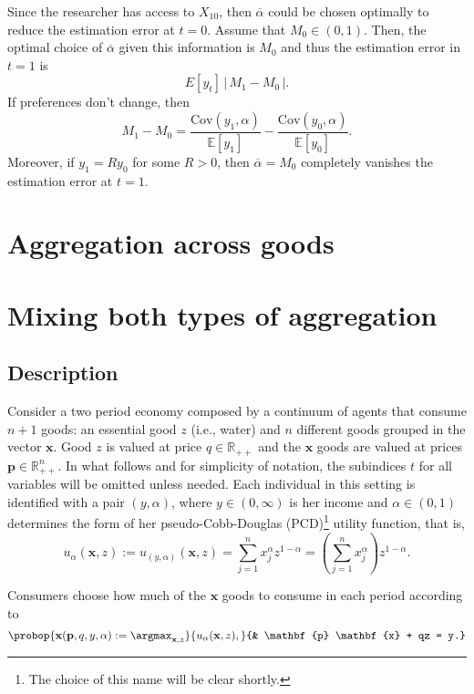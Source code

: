 \documentclass[english, a4paper,12pt]{article}
\begin{document}
Since the researcher has access to $X_{10}$, then $\overline{\alpha}$ could be chosen optimally to reduce the estimation error at $t=0$. Assume that $M_{0} \in (0,1)$. Then, the optimal choice of $\overline{\alpha}$ given this information is $M_{0}$ and thus the estimation error in $t=1$ is
	$$E[y_{t}]\, \Big|\, M_{1} - M_{0}\,\Big|.$$
If preferences don't change, then
	$$M_{1} - M_{0} = \frac{\mathrm{Cov}(y_{1}, \alpha)}{\mathbb{E}[y_{1}]} - \frac{\mathrm{Cov}(y_{0}, \alpha)}{\mathbb{E}[y_{0}]}.$$
Moreover, if $y_{1} = R y_{0}$ for some $R > 0$, then $\overline{\alpha} = M_{0}$ completely vanishes the estimation error at $t=1$.



\section{Aggregation across goods} \label{sec: OneGood}

\section{Mixing both types of aggregation} \label{sec:MixedAgg}

\subsection{Description}
Consider a two period economy composed by a continuum of agents that consume $n+1$ goods: an essential good $z$ (i.e., water) and $n$ different goods grouped in the vector $\mathbf{x}$. Good $z$ is valued at price $q \in \mathbb{R}_{++}$ and the $\mathbf{x}$ goods are valued at prices $\mathbf{p} \in \mathbb{R}^{n}_{++}$.  In what follows and for simplicity of notation, the subindices $t$ for all variables will be omitted unless needed. Each individual in this setting is identified with a pair $(y,\alpha)$, where $y \in (0,\infty)$ is her income and $\alpha \in (0,1)$ determines the form of her pseudo-Cobb-Douglas (PCD)\footnote{The choice of this name will be clear shortly.} utility function, that is,
	$$u_{\alpha}(\mathbf{x},z) := u_{(y,\alpha)}(\mathbf{x},z) = \sum_{j=1}^{n} x_{j}^{\alpha}z^{1-\alpha} = \left(\sum_{j=1}^{n} x_{j}^{\alpha}\right)z^{1-\alpha}.$$

Consumers choose how much of the $\mathbf{x}$ goods to consume in each period according to
	\begin{equation} \label{eq:probdisagg}
		\probop{\mathbf{x}(\mathbf{p}, q, y, \alpha) 
			:= \argmax_{\mathbf{x}, z}}{u_{\alpha}(\mathbf{x}, z),}
				{&	\mathbf{p} \mathbf{x} + qz = y.}
	\end{equation} 
\end{document}
